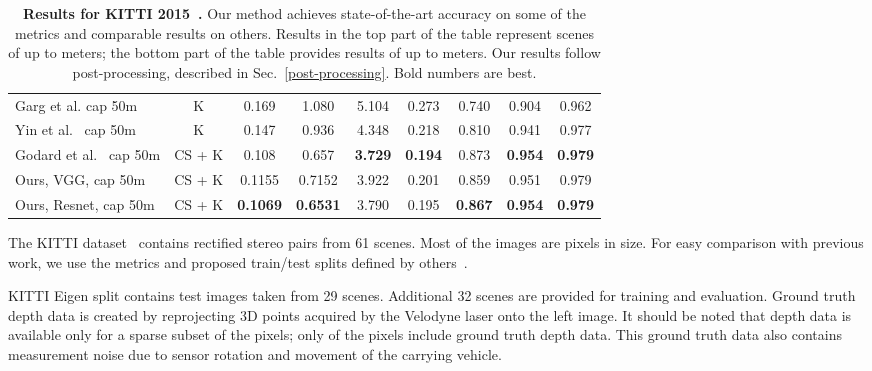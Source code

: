 \documentclass[10pt,twocolumn,letterpaper]{article}
\newcommand{\minisection}[1]{\vspace{1mm}\noindent{\textbf{#1}}}
\begin{document}
\begin{table*}[t]
{\begin{tabular}{lcccccccc}
			Garg et al. cap 50m~\cite{eigen2014depth}   & K       & 0.169                & 1.080                & 5.104               & 0.273                  & 0.740                    & 0.904                      & 0.962                     \\
			Yin et al.~\cite{geonet} cap 50m            & K       & 0.147                & 0.936                & 4.348               & 0.218                  & 0.810                    & 0.941                      & 0.977                     \\
			Godard et al.~\cite{monodepth17}  cap 50m   & CS + K  & 0.108                & 0.657                & \textbf{3.729}      & \textbf{0.194}         & 0.873                    & \textbf{0.954}             & \textbf{0.979}            \\
			Ours, VGG, cap 50m                          & CS + K  & 0.1155               & 0.7152               & 3.922               & 0.201                  & 0.859                    & 0.951                      & 0.979                     \\
			Ours, Resnet, cap 50m                       & CS + K  & \textbf{0.1069}      & \textbf{0.6531}      & 3.790               & 0.195                  & \textbf{0.867}           & \textbf{0.954}             & \textbf{0.979}            \\
			\bottomrule
		\end{tabular}
	}
	\vspace{0.1in}
	\caption{{\bf Results for KITTI 2015~\cite{Geiger2012AreSuite}.} Our method achieves state-of-the-art accuracy on some of the metrics and comparable results on others. Results in the top part of the table represent scenes of up to  meters; the bottom part of the table provides results of up to  meters. Our results follow post-processing, described in Sec.~\ref{post-processing}. Bold numbers are best.}
	\label{kitti-eigen-split}
\end{table*}


\minisection{KITTI Eigen split.}
The KITTI dataset~\cite{Geiger2012AreSuite} contains  rectified stereo pairs from 61 scenes. Most of the images are  pixels in size. For easy comparison with previous work, we use the metrics and proposed train/test splits defined by others~\cite{eigen2014depth}.

KITTI Eigen split contains  test images taken from 29 scenes. Additional 32 scenes are provided for training and evaluation. Ground truth depth data is created by reprojecting 3D points acquired by the Velodyne laser onto the left image. It should be noted that depth data is available only for a sparse subset of the pixels; only  of the pixels include ground truth depth data. This ground truth data also contains measurement noise due to sensor rotation and movement of the carrying vehicle.
\end{document}
